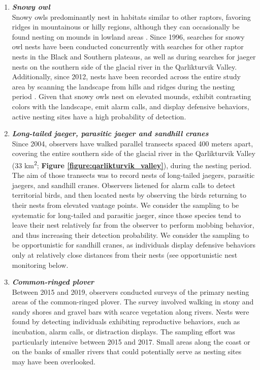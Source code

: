 \documentclass[a4paper,twoside,12pt]{article}
\begin{document}
\begin{enumerate}[label=\roman*]
        \item[] \textit{\textbf{Snowy owl}} \\
        Snowy owls predominantly nest in habitats similar to other raptors, favoring ridges in mountainous or hilly regions, although they can occasionally be found nesting on mounds in lowland areas \citep{seyer2020}. Since 1996, searches for snowy owl nests have been conducted concurrently with searches for other raptor nests in the Black and Southern plateaus, as well as during searches for jaeger nests on the southern side of the glacial river in the Qarlikturvik Valley. Additionally, since 2012, nests have been recorded across the entire study area by scanning the landscape from hills and ridges during the nesting period \citep{duchesne2021}. Given that snowy owls nest on elevated mounds, exhibit contrasting colors with the landscape, emit alarm calls, and display defensive behaviors, active nesting sites have a high probability of detection.
        
        \item[] \textit{\textbf{Long-tailed jaeger, parasitic jaeger and sandhill cranes}} \\
        Since 2004, observers have walked parallel transects spaced 400 meters apart, covering the entire southern side of the glacial river in the Qarlikturvik Valley (33 km\textsuperscript{2}; \textbf{Figure \ref{figure:qarlikturvik_valley}}), during the nesting period. The aim of those transects was to record nests of long-tailed jaegers, parasitic jaegers, and sandhill cranes. Observers listened for alarm calls to detect territorial birds, and then located nests by observing the birds returning to their nests from elevated vantage points. We consider the sampling to be systematic for long-tailed and parasitic jaeger, since those species tend to leave their nest relatively far from the observer to perform mobbing behavior, and thus increasing their detection probability. We consider the sampling to be opportunistic for sandhill cranes, as individuals display defensive behaviors only at relatively close distances from their nests (see opportunistic nest monitoring below.
        
        \item[] \textit{\textbf{Common-ringed plover}} \\
        Between 2015 and 2019, observers conducted surveys of the primary nesting areas of the common-ringed plover. The survey involved walking in stony and sandy shores and gravel bars with scarce vegetation along rivers. Nests were found by detecting individuals exhibiting reproductive behaviors, such as incubation, alarm calls, or distraction displays. The sampling effort was particularly intensive between 2015 and 2017. Small areas along the coast or on the banks of smaller rivers that could potentially serve as nesting sites may have been overlooked.
        

\end{enumerate}
\end{document}
